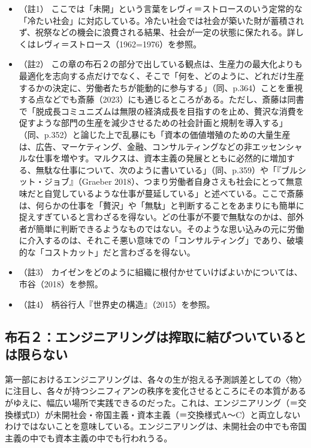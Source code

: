 \begin{itemize}
\tightlist
\item
  （註1）
  ここでは「未開」という言葉をレヴィ＝ストロースのいう定常的な「冷たい社会」に対応している。冷たい社会では社会が築いた財が蓄積されず、祝祭などの機会に浪費される結果、社会が一定の状態に保たれる。詳しくはレヴィ＝ストロース（1962=1976）\cite{LeviStrauss}を参照。
\item
  （註2）
  この章の布石２の部分で出している観点は、生産力の最大化よりも最適化を志向する点だけでなく、そこで「何を、どのように、どれだけ生産するかの決定に、労働者たちが能動的に参与する」（同、p.364）ことを重視する点などでも斎藤（2023）\cite{Saito}にも通じるところがある。ただし、斎藤は同書で「脱成長コミュニズムは無限の経済成長を目指すのを止め、贅沢な消費を促すような部門の生産を減少させるための社会計画と規制を導入する」（同、p.352）と論じた上で乱暴にも「資本の価値増殖のための大量生産は、広告、マーケティング、金融、コンサルティングなどの非エッセンシャルな仕事を増やす。マルクスは、資本主義の発展とともに必然的に増加する、無駄な仕事について、次のように書いている」（同、p.359）や「『ブルシット・ジョブ』（Graeber
  2018）、つまり労働者自身さえも社会にとって無意味だと自覚しているような仕事が蔓延している」と述べている。ここで斎藤は、何らかの仕事を「贅沢」や「無駄」と判断することをあまりにも簡単に捉えすぎていると言わざるを得ない。どの仕事が不要で無駄なのかは、部外者が簡単に判断できるようなものではない。そのような思い込みの元に労働に介入するのは、それこそ悪い意味での「コンサルティング」であり、破壊的な「コストカット」だと言わざるを得ない。
\item
  （註3）
  カイゼンをどのように組織に根付かせていけばよいかについては、市谷（2018）\cite{Ichitani}を参照。
\item
  （註4） 柄谷行人『世界史の構造』（2015）を参照。
\end{itemize}

\subsection{布石２：エンジニアリングは搾取に結びついているとは限らない}\label{ux5e03ux77f3uxff12ux30a8ux30f3ux30b8ux30cbux30a2ux30eaux30f3ux30b0ux306fux643eux53d6ux306bux7d50ux3073ux3064ux3044ux3066ux3044ux308bux3068ux306fux9650ux3089ux306aux3044}

第一部におけるエンジニアリングは、各々の生が抱える予測誤差としての〈物〉に注目し、各々が持つシニフィアンの秩序を変化させるところにその本質があるがゆえに、幅広い場所で実践できるのだった。これは、エンジニアリング（＝交換様式D）が未開社会・帝国主義・資本主義（＝交換様式A～C）と両立しないわけではないことを意味している。エンジニアリングは、未開社会の中でも帝国主義の中でも資本主義の中でも行われうる。

